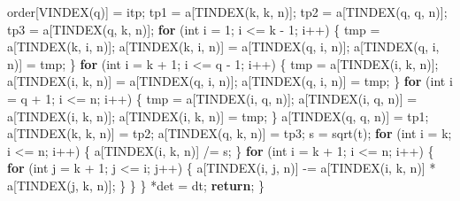 \documentclass[12pt,]{article}
\newenvironment{Shaded}{\begin{snugshade}}{\end{snugshade}}
\newcommand{\ControlFlowTok}[1]{\textcolor[rgb]{0.13,0.29,0.53}{\textbf{#1}}}
\newcommand{\DataTypeTok}[1]{\textcolor[rgb]{0.13,0.29,0.53}{#1}}
\newcommand{\DecValTok}[1]{\textcolor[rgb]{0.00,0.00,0.81}{#1}}
\newcommand{\NormalTok}[1]{#1}
\begin{document}
\begin{Shaded}
\begin{Highlighting}[]
\NormalTok{    order[VINDEX(q)] = itp;}
\NormalTok{    tp1 = a[TINDEX(k, k, n)];}
\NormalTok{    tp2 = a[TINDEX(q, q, n)];}
\NormalTok{    tp3 = a[TINDEX(q, k, n)];}
    \ControlFlowTok{for}\NormalTok{ (}\DataTypeTok{int}\NormalTok{ i = }\DecValTok{1}\NormalTok{; i <= k - }\DecValTok{1}\NormalTok{; i++) \{}
\NormalTok{      tmp = a[TINDEX(k, i, n)];}
\NormalTok{      a[TINDEX(k, i, n)] = a[TINDEX(q, i, n)];}
\NormalTok{      a[TINDEX(q, i, n)] = tmp;}
\NormalTok{    \}}
    \ControlFlowTok{for}\NormalTok{ (}\DataTypeTok{int}\NormalTok{ i = k + }\DecValTok{1}\NormalTok{; i <= q - }\DecValTok{1}\NormalTok{; i++) \{}
\NormalTok{      tmp = a[TINDEX(i, k, n)];}
\NormalTok{      a[TINDEX(i, k, n)] = a[TINDEX(q, i, n)];}
\NormalTok{      a[TINDEX(q, i, n)] = tmp;}
\NormalTok{    \}}
    \ControlFlowTok{for}\NormalTok{ (}\DataTypeTok{int}\NormalTok{ i = q + }\DecValTok{1}\NormalTok{; i <= n; i++) \{}
\NormalTok{      tmp = a[TINDEX(i, q, n)];}
\NormalTok{      a[TINDEX(i, q, n)] = a[TINDEX(i, k, n)];}
\NormalTok{      a[TINDEX(i, k, n)] = tmp;}
\NormalTok{    \}}
\NormalTok{    a[TINDEX(q, q, n)] = tp1;}
\NormalTok{    a[TINDEX(k, k, n)] = tp2;}
\NormalTok{    a[TINDEX(q, k, n)] = tp3;}
\NormalTok{    s = sqrt(t);}
    \ControlFlowTok{for}\NormalTok{ (}\DataTypeTok{int}\NormalTok{ i = k; i <= n; i++) \{}
\NormalTok{      a[TINDEX(i, k, n)] /= s;}
\NormalTok{    \}}
    \ControlFlowTok{for}\NormalTok{ (}\DataTypeTok{int}\NormalTok{ i = k + }\DecValTok{1}\NormalTok{; i <= n; i++) \{}
      \ControlFlowTok{for}\NormalTok{ (}\DataTypeTok{int}\NormalTok{ j = k + }\DecValTok{1}\NormalTok{; j <= i; j++) \{}
\NormalTok{        a[TINDEX(i, j, n)] -= a[TINDEX(i, k, n)] * a[TINDEX(j, k, n)];}
\NormalTok{      \}}
\NormalTok{    \}}
\NormalTok{  \}}
\NormalTok{  *det = dt;}
  \ControlFlowTok{return}\NormalTok{;}
\NormalTok{\}}


\end{Highlighting}
\end{Shaded}
\end{document}
